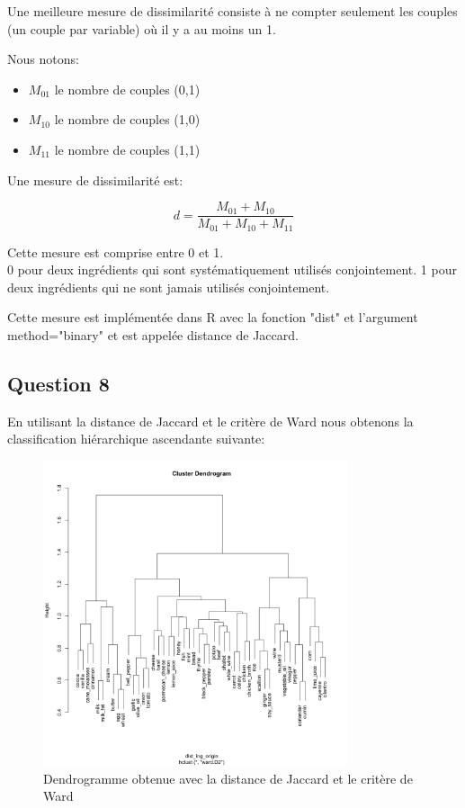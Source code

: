 \documentclass[a4paper,11pt,oneside,roman]{article}
\begin{document}
    Une meilleure mesure de dissimilarité consiste à ne compter seulement les couples (un couple par variable) où il y a au moins un 1.
    
    Nous notons:
    \begin{itemize}
        \item $M_{01}$ le nombre de couples (0,1)
        \item $M_{10}$ le nombre de couples (1,0)
        \item $M_{11}$ le nombre de couples (1,1)
    \end{itemize}

    Une mesure de dissimilarité est:

    \begin{equation}
        \nonumber
        d = \frac{M_{01}+M_{10}}{M_{01}+M_{10}+M_{11}}
    \end{equation}

    Cette mesure est comprise entre 0 et 1. \\
    0 pour deux ingrédients qui sont systématiquement utilisés conjointement.
    1 pour deux ingrédients qui ne sont jamais utilisés conjointement.

    Cette mesure est implémentée dans R avec la fonction "dist" et l'argument method="binary" et est appelée distance de Jaccard. 
    
    \subsection*{Question 8}
    En utilisant la distance de Jaccard et le critère de Ward nous obtenons la classification hiérarchique ascendante suivante:
    \begin{figure}
        \centering
        \includegraphics[width=0.8\textwidth]{imgs/CAH_dendrogramme_ingredients_binary.png}
        \caption{Dendrogramme obtenue avec la distance de Jaccard et le critère de Ward}
        \label{fig_K_means_choix_K}
    \end{figure}
\end{document}
